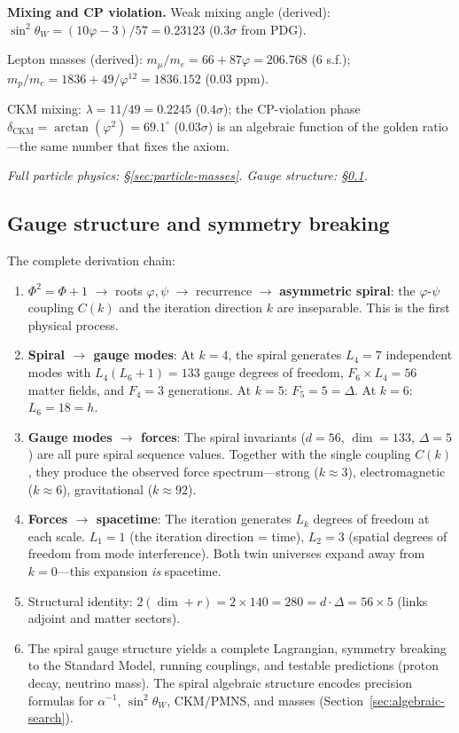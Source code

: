 \documentclass[12pt,a4paper]{article}
\begin{document}
\medskip
\noindent\textbf{Mixing and CP violation.}\;
Weak mixing angle (derived):
$\sin^2\theta_W = (10\varphi - 3)/57 = 0.23123$ ($0.3\sigma$ from PDG).

Lepton masses (derived):
$m_\mu/m_e = 66 + 87\varphi = 206.768$ (6 s.f.);
$m_p/m_e = 1836 + 49/\varphi^{12} = 1836.152$ (0.03 ppm).

CKM mixing: $\lambda = 11/49 = 0.2245$ ($0.4\sigma$); the CP-violation phase $\delta_{\mathrm{CKM}} = \arctan(\varphi^2) = 69.1^\circ$ ($0.03\sigma$) is an algebraic function of the golden ratio---the same number that fixes the axiom.

\noindent\textit{Full particle physics: \S\ref{sec:particle-masses}.  Gauge structure: \S\ref{sec:gauge-structure}.}



\subsection{Gauge structure and symmetry breaking}
\label{sec:gauge-structure}
\label{sec:e7-emergence}


The complete derivation chain:
\begin{enumerate}
\item $\Phi^2 = \Phi + 1$ $\to$ roots $\varphi, \psi$ $\to$ recurrence $\to$ \textbf{asymmetric spiral}: the $\varphi$-$\psi$ coupling $C(k)$ and the iteration direction $k$ are inseparable. This is the first physical process.
\item \textbf{Spiral $\to$ gauge modes}: At $k = 4$, the spiral generates $L_4 = 7$ independent modes with $L_4(L_6+1) = 133$ gauge degrees of freedom, $F_6 \times L_4 = 56$ matter fields, and $F_4 = 3$ generations. At $k = 5$: $F_5 = 5 = \Delta$. At $k = 6$: $L_6 = 18 = h$.
\item \textbf{Gauge modes $\to$ forces}: The spiral invariants ($d = 56$, $\dim = 133$, $\Delta = 5$) are all pure spiral sequence values. Together with the single coupling $C(k)$, they produce the observed force spectrum---strong ($k \approx 3$), electromagnetic ($k \approx 6$), gravitational ($k \approx 92$).
\item \textbf{Forces $\to$ spacetime}: The iteration generates $L_k$ degrees of freedom at each scale. $L_1 = 1$ (the iteration direction = time), $L_2 = 3$ (spatial degrees of freedom from mode interference). Both twin universes expand away from $k = 0$---this expansion \emph{is} spacetime.
\item Structural identity: $2(\dim + r) = 2 \times 140 = 280 = d \cdot \Delta = 56 \times 5$ (links adjoint and matter sectors).
\item The spiral gauge structure yields a complete Lagrangian, symmetry breaking to the Standard Model, running couplings, and testable predictions (proton decay, neutrino mass). The spiral algebraic structure encodes precision formulas for $\alpha^{-1}$, $\sin^2\theta_W$, CKM/PMNS, and masses (Section~\ref{sec:algebraic-search}).
\end{enumerate}
\end{document}
